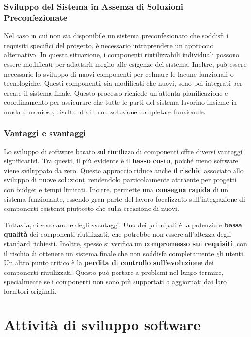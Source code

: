 \subsection{Sviluppo del Sistema in Assenza di Soluzioni Preconfezionate}
Nel caso in cui non sia disponibile un sistema preconfezionato che soddisfi i
requisiti specifici del progetto, è necessario intraprendere un approccio alternativo.
In questa situazione, i componenti riutilizzabili individuali possono essere modificati
per adattarli meglio alle esigenze del sistema. Inoltre, può essere necessario lo
sviluppo di nuovi componenti per colmare le lacune funzionali o tecnologiche. Questi
componenti, sia modificati che nuovi, sono poi integrati per creare il sistema finale.
Questo processo richiede un'attenta pianificazione e coordinamento per assicurare che
tutte le parti del sistema lavorino insieme in modo armonioso, risultando in una
soluzione completa e funzionale.
\subsection{Vantaggi e svantaggi}
Lo sviluppo di software basato sul riutilizzo di componenti offre diversi vantaggi
significativi. Tra questi, il più evidente è il \textbf{basso costo}, poiché meno
software viene sviluppato da zero. Questo approccio riduce anche il \textbf{rischio}
associato allo sviluppo di nuove soluzioni, rendendolo particolarmente attraente per
progetti con budget e tempi limitati. Inoltre, permette una \textbf{consegna rapida}
di un sistema funzionante, essendo gran parte del lavoro focalizzato sull'integrazione
di componenti esistenti piuttosto che sulla creazione di nuovi.

Tuttavia, ci sono anche degli svantaggi. Uno dei principali è la potenziale
\textbf{bassa qualità} dei componenti riutilizzati, che potrebbe non essere all'altezza
degli standard richiesti. Inoltre, spesso si verifica un \textbf{compromesso sui requisiti},
con il rischio di ottenere un sistema finale che non soddisfa completamente gli utenti.
Un altro punto critico è la \textbf{perdita di controllo sull'evoluzione} dei componenti
riutilizzati. Questo può portare a problemi nel lungo termine, specialmente se i
componenti non sono più supportati o aggiornati dai loro fornitori originali.

\chapter{Attività di sviluppo software}

